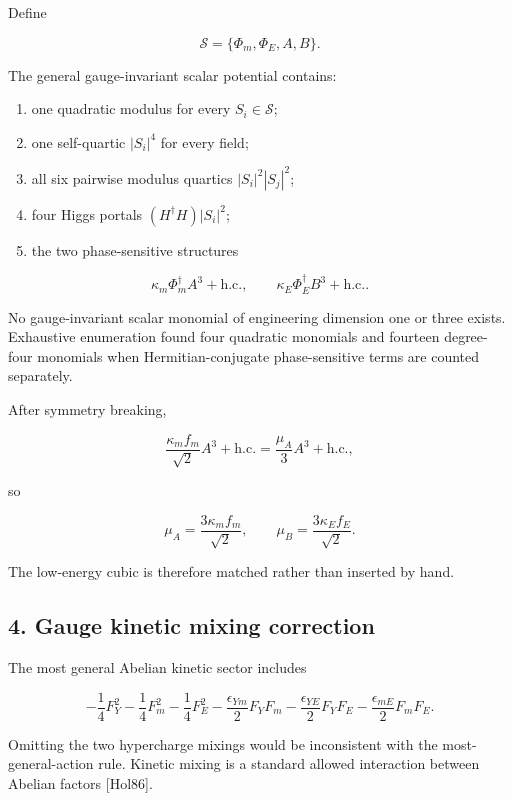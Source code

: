 \documentclass[
]{article}
\providecommand{\tightlist}{%
  \setlength{\itemsep}{0pt}\setlength{\parskip}{0pt}}
\begin{document}
Define

\[
\mathcal S=\{\Phi_m,\Phi_E,A,B\}.
\]

The general gauge-invariant scalar potential contains:

\begin{enumerate}
\def\labelenumi{\arabic{enumi}.}
\tightlist
\item
  one quadratic modulus for every \(S_i\in\mathcal S\);
\item
  one self-quartic \(|S_i|^4\) for every field;
\item
  all six pairwise modulus quartics \(|S_i|^2|S_j|^2\);
\item
  four Higgs portals \((H^\dagger H)|S_i|^2\);
\item
  the two phase-sensitive structures
\end{enumerate}

\[
\kappa_m\Phi_m^\dagger A^3+\mathrm{h.c.},
\qquad
\kappa_E\Phi_E^\dagger B^3+\mathrm{h.c.}.
\]

No gauge-invariant scalar monomial of engineering dimension one or three
exists. Exhaustive enumeration found four quadratic monomials and
fourteen degree-four monomials when Hermitian-conjugate phase-sensitive
terms are counted separately.

After symmetry breaking,

\[
\frac{\kappa_m f_m}{\sqrt2}A^3+\mathrm{h.c.}
=\frac{\mu_A}{3}A^3+\mathrm{h.c.},
\]

so

\[
\mu_A=\frac{3\kappa_m f_m}{\sqrt2},
\qquad
\mu_B=\frac{3\kappa_E f_E}{\sqrt2}.
\]

The low-energy cubic is therefore matched rather than inserted by hand.

\hypertarget{gauge-kinetic-mixing-correction}{%
\subsection{4. Gauge kinetic mixing
correction}\label{gauge-kinetic-mixing-correction}}

The most general Abelian kinetic sector includes

\[
-\frac14F_Y^2-\frac14F_m^2-\frac14F_E^2
-\frac{\epsilon_{Ym}}2F_YF_m
-\frac{\epsilon_{YE}}2F_YF_E
-\frac{\epsilon_{mE}}2F_mF_E.
\]

Omitting the two hypercharge mixings would be inconsistent with the
most-general-action rule. Kinetic mixing is a standard allowed
interaction between Abelian factors {[}Hol86{]}.
\end{document}
